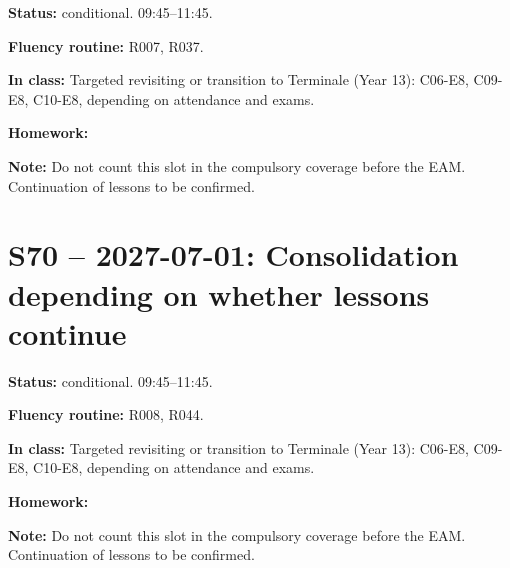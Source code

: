 \textbf{Status:} conditional. 09:45–11:45.\par\textbf{Fluency routine:} R007, R037.\par\textbf{In class:} Targeted revisiting or transition to Terminale (Year 13): C06-E8, C09-E8, C10-E8, depending on attendance and exams.\par\textbf{Homework:} \par\textbf{Note:} Do not count this slot in the compulsory coverage before the EAM. Continuation of lessons to be confirmed.
\section*{S70 -- 2027-07-01: Consolidation depending on whether lessons continue}
\textbf{Status:} conditional. 09:45–11:45.\par\textbf{Fluency routine:} R008, R044.\par\textbf{In class:} Targeted revisiting or transition to Terminale (Year 13): C06-E8, C09-E8, C10-E8, depending on attendance and exams.\par\textbf{Homework:} \par\textbf{Note:} Do not count this slot in the compulsory coverage before the EAM. Continuation of lessons to be confirmed.
